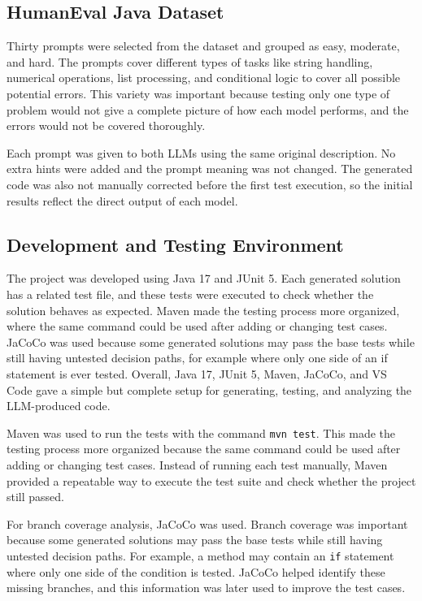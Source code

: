 \documentclass[journal]{IEEEtran}
\begin{document}
\subsection{HumanEval Java Dataset}
Thirty prompts were selected from the dataset and grouped as easy, moderate, and hard. The prompts cover different types of tasks like string handling, numerical operations, list processing, and conditional logic to cover all possible potential errors. This variety was important because testing only one type of problem would not give a complete picture of how each model performs, and the errors would not be covered thoroughly.

Each prompt was given to both LLMs using the same original description. No extra hints were added and the prompt meaning was not changed. The generated code was also not manually corrected before the first test execution, so the initial results reflect the direct output of each model.

\subsection{Development and Testing Environment}

The project was developed using Java 17 and JUnit 5. Each generated solution has a related test file, and these tests were executed to check whether the solution behaves as expected. Maven made the testing process more organized, where the same command could be used after adding or changing test cases. JaCoCo was used because some generated solutions may pass the base tests while still having untested decision paths, for example where only one side of an if statement is ever tested. Overall, Java 17, JUnit 5, Maven, JaCoCo, and VS Code gave a simple but complete setup for generating, testing, and analyzing the LLM-produced code.

Maven was used to run the tests with the command \texttt{mvn test}. This made the testing process more organized because the same command could be used after adding or changing test cases. Instead of running each test manually, Maven provided a repeatable way to execute the test suite and check whether the project still passed.

For branch coverage analysis, JaCoCo was used. Branch coverage was important because some generated solutions may pass the base tests while still having untested decision paths. For example, a method may contain an \texttt{if} statement where only one side of the condition is tested. JaCoCo helped identify these missing branches, and this information was later used to improve the test cases.
\end{document}
